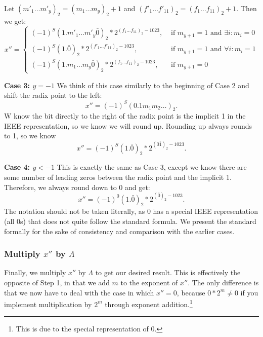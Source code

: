 \documentclass[11pt]{scrartcl} %
\begin{document}
Let $(m'_1 \hdots m'_y)_2 = (m_1 \hdots m_y)_2 + 1$ and $(f'_1 \hdots f'_{11})_2 = (f_1 \hdots f_{11})_2 + 1$. Then we get:
\begin{equation}
    x'' =
        \begin{cases}
            (-1)^S (1.m'_1 \hdots m'_y \bar{0})_2 * 2^{(f_1 \hdots f_{11})_2-1023}, & \text{ if } m_{y+1} = 1 \text{ and } \exists i: m_i = 0 \\
            (-1)^S (1.\bar{0})_2 * 2^{(f'_1 \hdots f'_{11})_2-1023}, & \text{ if } m_{y+1} = 1 \text{ and } \forall i: m_i = 1 \\
            (-1)^S (1.m_1 \hdots m_y \bar{0})_2 * 2^{(f_1 \hdots f_{11})_2-1023}, & \text{ if } m_{y+1} = 0
        \end{cases}
\end{equation}

\textbf{Case 3: $y = -1$}
We think of this case similarly to the beginning of Case 2 and shift the radix point to the left:
\[ x'' = (-1)^S (0.1m_1 m_2 \hdots)_2. \]
W know the bit directly to the right of the radix point is the implicit 1 in the IEEE representation, so we know we will round up. Rounding up always rounds to 1, so we know
\[ x'' = (-1)^S (1.\bar{0})_2 * 2^{(0\bar{1})_2 - 1023}. \]

\textbf{Case 4: $y < -1$}
This is exactly the same as Case 3, except we know there are some number of leading zeros between the radix point and the implicit 1. Therefore, we always round down to 0 and get:
\[ x'' = (-1)^0 (1.\bar{0})_2 * 2^{(\bar{0})_2 - 1023}. \]
The notation should not be taken literally, as 0 has a special IEEE representation (all 0s) that does not quite follow the standard formula. We present the standard formally for the sake of consistency and comparison with the earlier cases. \newline

\subsubsection{Multiply $x''$ by $\Lambda$}
Finally, we multiply $x''$ by $\Lambda$ to get our desired result. This is effectively the opposite of Step 1, in that we add $m$ to the exponent of $x''$. The only difference is that we now have to deal with the case in which $x'' = 0$, because $0*2^m \neq 0$ if you implement multiplication by $2^m$ through exponent addition.\footnote{This is due to the special representation of 0.}
\end{document}
